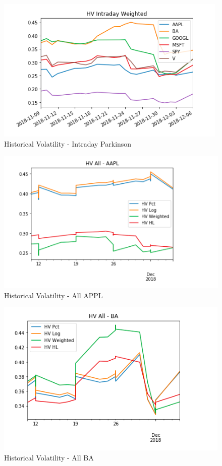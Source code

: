 \documentclass{article}
\begin{document}
\begin{figure}[h!]
\includegraphics[width =\textwidth]{images/HV/HV_W.png}
\caption{Historical Volatility - Intraday Parkinson}
\centering
\end{figure}
\begin{figure}[h!]
\includegraphics[width =\textwidth]{images/HV/HV-ALL-AAPL.png}
\caption{Historical Volatility - All APPL}
\centering
\end{figure}
\begin{figure}[h!]
\includegraphics[width =\textwidth]{images/HV/HV-ALL-BA.png}
\caption{Historical Volatility - All BA}
\centering
\end{figure}
\end{document}
